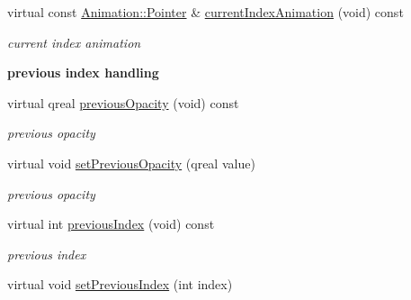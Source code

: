 \begin{Indent}
\begin{DoxyCompactItemize}
\mbox{\label{class_tab_bar_data_adad56510722780e76247efcf7bfc8d83}} 
virtual const \hyperlink{class_animation_ac48a8d074abd43dc3f6485353ba24e30}{Animation\+::\+Pointer} \& \hyperlink{class_tab_bar_data_adad56510722780e76247efcf7bfc8d83}{current\+Index\+Animation} (void) const
\begin{DoxyCompactList}\small\item\em current index animation \end{DoxyCompactList}\end{DoxyCompactItemize}
\end{Indent}
\begin{Indent}\textbf{ previous index handling}\par
\begin{DoxyCompactItemize}
\item 
\mbox{\label{class_tab_bar_data_aa7ebb6259e83d74509e48eea32bd65b2}} 
virtual qreal \hyperlink{class_tab_bar_data_aa7ebb6259e83d74509e48eea32bd65b2}{previous\+Opacity} (void) const
\begin{DoxyCompactList}\small\item\em previous opacity \end{DoxyCompactList}\item 
\mbox{\label{class_tab_bar_data_af3922d4a05a73fa4432149f3c91c933f}} 
virtual void \hyperlink{class_tab_bar_data_af3922d4a05a73fa4432149f3c91c933f}{set\+Previous\+Opacity} (qreal value)
\begin{DoxyCompactList}\small\item\em previous opacity \end{DoxyCompactList}\item 
\mbox{\label{class_tab_bar_data_aa811e034acdee49d99815d5a7f722f3a}} 
virtual int \hyperlink{class_tab_bar_data_aa811e034acdee49d99815d5a7f722f3a}{previous\+Index} (void) const
\begin{DoxyCompactList}\small\item\em previous index \end{DoxyCompactList}\item 
\mbox{\label{class_tab_bar_data_a51d7dd23b30829c562830bb66a55b0e3}} 
virtual void \hyperlink{class_tab_bar_data_a51d7dd23b30829c562830bb66a55b0e3}{set\+Previous\+Index} (int index)

\end{DoxyCompactItemize}
\end{Indent}
